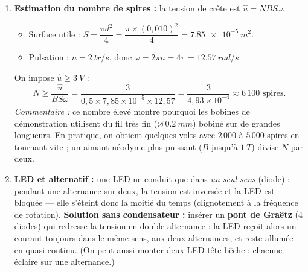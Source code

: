 \documentclass[11pt]{article}
\begin{document}
\begin{corrige}
\begin{enumerate}
\item \textbf{Estimation du nombre de spires :} la tension de crête est $\hat{u} = N B S \omega$.
\begin{itemize}
\item Surface utile : $S = \dfrac{\pi d^2}{4} = \dfrac{\pi \times (0,010)^2}{4} = \SI{7,85e-5}{m^2}$.
\item Pulsation : $n = \SI{2}{tr/s}$, donc $\omega = 2\pi n = 4\pi = \SI{12,57}{rad/s}$.
\end{itemize}
On impose $\hat{u} \ge \SI{3}{V}$ :
\[ N \ge \frac{\hat{u}}{B S \omega} = \frac{3}{0,5 \times 7,85\times 10^{-5} \times 12,57} = \frac{3}{4,93\times 10^{-4}} \approx \boxed{6\,100 \text{ spires}}. \]
\emph{Commentaire :} ce nombre élevé montre pourquoi les bobines de démonstration utilisent du fil très fin ($\varnothing\,\SI{0,2}{mm}$) bobiné sur de grandes longueurs. En pratique, on obtient quelques volts avec $2\,000$ à $5\,000$ spires en tournant vite ; un aimant néodyme plus puissant ($B$ jusqu'à $\SI{1}{T}$) divise $N$ par deux.

\item \textbf{LED et alternatif :} une LED ne conduit que dans \emph{un seul sens} (diode) : pendant une alternance sur deux, la tension est inversée et la LED est bloquée — elle s'éteint donc la moitié du temps (clignotement à la fréquence de rotation). \textbf{Solution sans condensateur :} insérer un \textbf{pont de Graëtz} (4 diodes) qui redresse la tension en double alternance : la LED reçoit alors un courant toujours dans le même sens, aux deux alternances, et reste allumée en quasi-continu. (On peut aussi monter deux LED tête-bêche : chacune éclaire sur une alternance.)
\end{enumerate}
\end{corrige}
\end{document}
